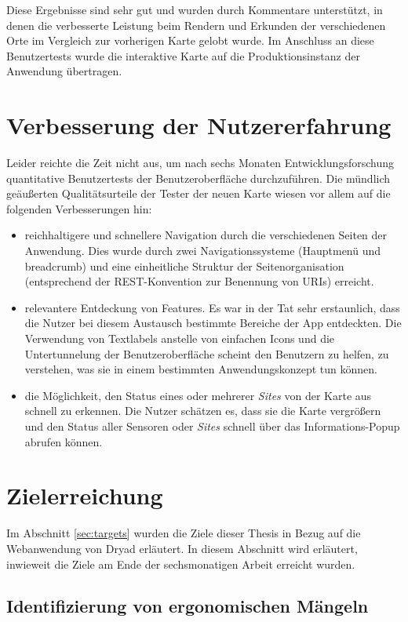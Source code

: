 Diese Ergebnisse sind sehr gut und wurden durch Kommentare unterstützt, in denen die verbesserte Leistung beim Rendern und Erkunden der verschiedenen Orte im Vergleich zur vorherigen Karte gelobt wurde.
Im Anschluss an diese Benutzertests wurde die interaktive Karte auf die Produktionsinstanz der Anwendung übertragen.

\section{Verbesserung der Nutzererfahrung}

Leider reichte die Zeit nicht aus, um nach sechs Monaten Entwicklungsforschung quantitative Benutzertests der Benutzeroberfläche durchzuführen.
Die mündlich geäußerten Qualitätsurteile der Tester der neuen Karte wiesen vor allem auf die folgenden Verbesserungen hin:

\begin{itemize}
  \item reichhaltigere und schnellere Navigation durch die verschiedenen Seiten der Anwendung. Dies wurde durch zwei Navigationssysteme (Hauptmenü und breadcrumb) und eine einheitliche Struktur der Seitenorganisation (entsprechend der \ac{REST}-Konvention zur Benennung von \ac{URI}s) erreicht.
  \item relevantere Entdeckung von Features. Es war in der Tat sehr erstaunlich, dass die Nutzer bei diesem Austausch bestimmte Bereiche der App entdeckten. Die Verwendung von Textlabels anstelle von einfachen Icons und die Untertunnelung der Benutzeroberfläche scheint den Benutzern zu helfen, zu verstehen, was sie in einem bestimmten Anwendungskonzept tun können.
  \item die Möglichkeit, den Status eines oder mehrerer \textit{Sites} von der Karte aus schnell zu erkennen. Die Nutzer schätzen es, dass sie die Karte vergrößern und den Status aller Sensoren oder \textit{Sites} schnell über das Informations-Popup abrufen können.
\end{itemize}

\section{Zielerreichung}

Im Abschnitt \ref{sec:targets} wurden die Ziele dieser Thesis in Bezug auf die Webanwendung von Dryad erläutert.
In diesem Abschnitt wird erläutert, inwieweit die Ziele am Ende der sechsmonatigen Arbeit erreicht wurden.

\subsection{Identifizierung von ergonomischen Mängeln}


